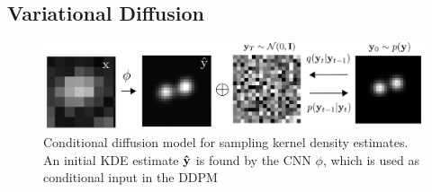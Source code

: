 \documentclass{article}
\begin{document}






\subsection{Variational Diffusion}

\begin{figure}
\includegraphics[scale=4.5]{Denoise.png}
\caption{Conditional diffusion model for sampling kernel density estimates. An initial KDE estimate $\bold{\hat{y}}$ is found by the CNN $\phi$, which is used as conditional input in the DDPM}
\end{figure}
\end{document}
